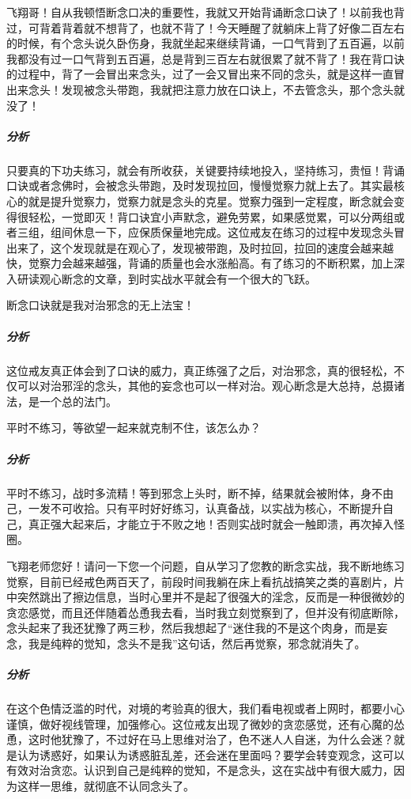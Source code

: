 \begin{case}
    飞翔哥！自从我顿悟断念口决的重要性，我就又开始背诵断念口诀了！以前我也背过，可背着背着就不想背了，也就不背了！今天睡醒了就躺床上背了好像二百左右的时候，有个念头说久卧伤身，我就坐起来继续背诵，一口气背到了五百遍，以前我都没有过一口气背到五百遍，总是背到三百左右就很累了就不背了！我在背口诀的过程中，背了一会冒出来念头，过了一会又冒出来不同的念头，就是这样一直冒出来念头！发现被念头带跑，我就把注意力放在口诀上，不去管念头，那个念头就没了！
    \subparagraph{分析} 只要真的下功夫练习，就会有所收获，关键要持续地投入，坚持练习，贵恒！背诵口诀或者念佛时，会被念头带跑，及时发现拉回，慢慢觉察力就上去了。其实最核心的就是提升觉察力，觉察力就是念头的克星。觉察力强到一定程度，断念就会变得很轻松，一觉即灭！背口诀宜小声默念，避免劳累，如果感觉累，可以分两组或者三组，组间休息一下，应保质保量地完成。这位戒友在练习的过程中发现念头冒出来了，这个发现就是在观心了，发现被带跑，及时拉回，拉回的速度会越来越快，觉察力会越来越强，背诵的质量也会水涨船高。有了练习的不断积累，加上深入研读观心断念的文章，到时实战水平就会有一个很大的飞跃。
\end{case}

\begin{case}
    断念口诀就是我对治邪念的无上法宝！
    \subparagraph{分析} 这位戒友真正体会到了口诀的威力，真正练强了之后，对治邪念，真的很轻松，不仅可以对治邪淫的念头，其他的妄念也可以一样对治。观心断念是大总持，总摄诸法，是一个总的法门。
\end{case}

\begin{case}
    平时不练习，等欲望一起来就克制不住，该怎么办？
    \subparagraph{分析} 平时不练习，战时多流精！等到邪念上头时，断不掉，结果就会被附体，身不由己，一发不可收拾。只有平时好好练习，认真备战，以实战为核心，不断提升自己，真正强大起来后，才能立于不败之地！否则实战时就会一触即溃，再次掉入怪圈。
\end{case}

\begin{case}
    飞翔老师您好！请问一下您一个问题，自从学习了您教的断念实战，我不断地练习觉察，目前已经戒色两百天了，前段时间我躺在床上看抗战搞笑之类的喜剧片，片中突然跳出了擦边信息，当时心里并不是起了很强大的淫念，反而是一种很微妙的贪恋感觉，而且还伴随着怂恿我去看，当时我立刻觉察到了，但并没有彻底断除，念头起来了我还犹豫了两三秒，然后我想起了“迷住我的不是这个肉身，而是妄念，我是纯粹的觉知，念头不是我”这句话，然后再觉察，邪念就消失了。
    \subparagraph{分析} 在这个色情泛滥的时代，对境的考验真的很大，我们看电视或者上网时，都要小心谨慎，做好视线管理，加强修心。这位戒友出现了微妙的贪恋感觉，还有心魔的怂恿，这时他犹豫了，不过好在马上思维对治了，色不迷人人自迷，为什么会迷？就是认为诱惑好，如果认为诱惑脏乱差，还会迷在里面吗？要学会转变观念，这可以有效对治贪恋。认识到自己是纯粹的觉知，不是念头，这在实战中有很大威力，因为这样一思维，就彻底不认同念头了。
\end{case}

